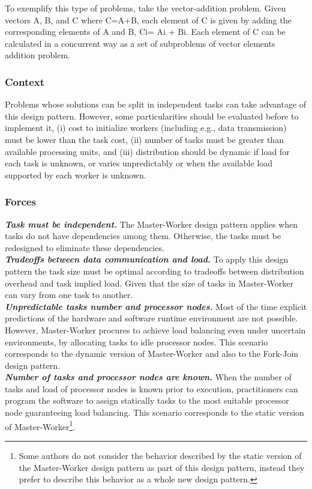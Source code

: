 To exemplify this type of problems, take the vector-addition problem. Given vectors A, B, and C where C=A+B, each element of C is given by adding the corresponding elements of A and B, Ci= Ai + Bi. Each element of C can be calculated in a concurrent way as a set of subproblems of vector elements addition problem.

\subsubsection{Context}
Problems whose solutions can be split in independent tasks can take advantage of this design pattern. However, some particularities should be evaluated before to implement it, (i) cost to initialize workers (including e.g., data transmission) must be lower than the task cost, (ii) number of tasks must be greater than available processing units, and (iii) distribution should be dynamic if load for each task is unknown, or varies unpredictably or when the available load supported by each worker is unknown.

\subsubsection{Forces}
\textbf{\textit{Task must be independent.  }}The Master-Worker design pattern applies when tasks do not have dependencies among them. Otherwise, the tasks must be redesigned to eliminate these dependencies.\\

\noindent\textbf{\textit{Tradeoffs between data communication and load. }}To apply this design pattern the task size must be optimal according to tradeoffs between distribution overhead and task implied load. Given that the size of tasks in Master-Worker can vary from one task to another. \\

\noindent\textbf{\textit{Unpredictable tasks number and processor nodes. }}Most of the time explicit predictions of the hardware and software runtime environment are not possible. However, Master-Worker procures to achieve load balancing even under uncertain environments, by allocating tasks to idle processor nodes. This scenario corresponds to the dynamic version of Master-Worker and also to the Fork-Join design pattern.\\

\noindent\textbf{\textit{Number of tasks and processor nodes are known. }}When the number of tasks and load of processor nodes is known prior to execution, practitioners can program the software to assign statically tasks to the most suitable processor node guaranteeing load balancing. This scenario corresponds to the static version of Master-Worker\footnote{ Some authors do not consider the behavior described by the static version of the Master-Worker design pattern as part of this design pattern, instead they prefer to describe this behavior as a whole new design pattern.}.

